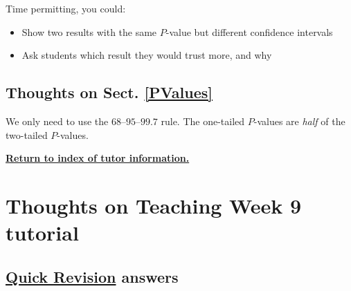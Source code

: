 \documentclass[
  11pt,
  a4paper,
  krantz2]{krantz}
\providecommand{\tightlist}{%
  \setlength{\itemsep}{0pt}\setlength{\parskip}{0pt}}
\begin{document}
Time permitting, you could:

\begin{itemize}
\tightlist
\item
  Show two results with the same \(P\)-value but different confidence intervals
\item
  Ask students which result they would trust more, and why
\end{itemize}

\subsection{Thoughts on Sect. \ref{PValues}}\label{thoughts-on-sect.-refpvalues}

We only need to use the \(68\)--\(95\)--\(99.7\) rule.
The one-tailed \(P\)-values are \emph{half} of the two-tailed \(P\)-values.

\href{TutorInfo.html}{\textbf{Return to index of tutor information.}}

\section{Thoughts on Teaching Week 9 tutorial}\label{Lecture9ThoughtsForTutors}

\subsection{\texorpdfstring{\hyperref[QuickRevision-Tutorial9]{Quick Revision} answers}{Quick Revision answers}}\label{quick-revision-answers-8}
\end{document}
